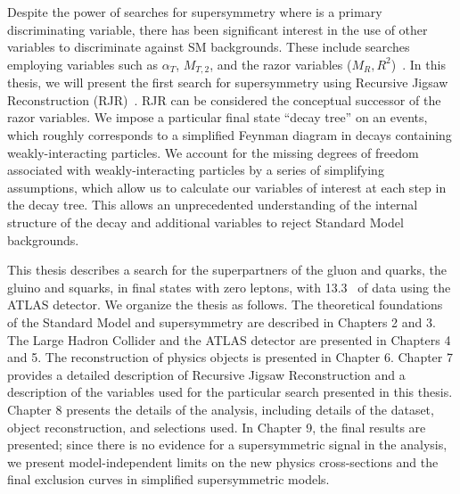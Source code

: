 Despite the power of searches for supersymmetry where \met is a primary discriminating variable, there has been significant interest in the use of other variables to discriminate against SM backgrounds.
These include searches employing variables such as $\alpha_{T}$, $ M_{T,2}$, and the razor variables ($M_R, R^2$)~\cite{SUSY-2014-05, SUSY-2014-06, SUSY-2014-07, CMS-SUS-12-005, CMS-SUS-11-024, CMS-SUS-12-005, CMS-SUS-10-003, CMS-SUS-11-003, CMS-SUS-12-002,CMS-SUS-13-019, CMS-SUS-15-003, SUSY-2011-22}.
In this thesis, we will present the first search for supersymmetry using Recursive Jigsaw Reconstruction (RJR)~\cite{Jackson:2016mfb,ATLAS-CONF-2016-078}.
RJR can be considered the conceptual successor of the razor variables.
We impose a particular final state ``decay tree'' on an events, which roughly corresponds to a simplified Feynman diagram in decays containing weakly-interacting particles.
We account for the missing degrees of freedom associated with weakly-interacting particles by a series of simplifying assumptions, which allow us to calculate our variables of interest at each step in the decay tree.
This allows an unprecedented understanding of the internal structure of the decay and additional variables to reject Standard Model backgrounds.

This thesis describes a search for the superpartners of the gluon and quarks, the gluino and squarks, in final states with zero leptons, with 13.3 \ifb~of data using the ATLAS detector.
We organize the thesis as follows.
The theoretical foundations of the Standard Model and supersymmetry are described in Chapters 2 and 3.
The Large Hadron Collider and the ATLAS detector are presented in Chapters 4 and 5.
The reconstruction of physics objects is presented in Chapter 6.
Chapter 7 provides a detailed description of Recursive Jigsaw Reconstruction and a description of the variables used for the particular search presented in this thesis.
Chapter 8 presents the details of the analysis, including details of the dataset, object reconstruction, and selections used.
In Chapter 9, the final results are presented; since there is no evidence for a supersymmetric signal in the analysis, we present model-independent limits on the new physics cross-sections and the final exclusion curves in simplified supersymmetric models.
